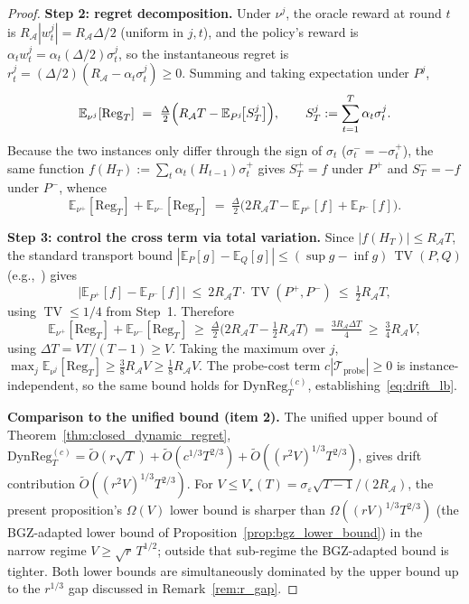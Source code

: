 \documentclass[11pt]{article}
\newcommand{\E}{\mathbb{E}}
\newcommand{\cA}{\mathcal{A}}
\newcommand{\cTprobe}{\mathcal{T}_{\mathrm{probe}}}
\newcommand{\DynReg}{\mathrm{DynReg}}
\DeclareMathOperator{\TV}{TV}
\begin{document}
\begin{proof}
\textbf{Step 2: regret decomposition.}
Under $\nu^{j}$, the oracle reward at round $t$ is $R_{\cA}|w_t^{j}|=R_{\cA}\Delta/2$
(uniform in $j,t$), and the policy's reward is
$\alpha_t w_t^{j}=\alpha_t(\Delta/2)\sigma_t^{j}$, so the instantaneous regret is
$r_t^{j}=(\Delta/2)(R_{\cA}-\alpha_t\sigma_t^{j})\ge 0$.  Summing and taking
expectation under $P^{j}$,
\[
  \E_{\nu^{j}}[\mathrm{Reg}_T]
  \ =\ \tfrac{\Delta}{2}\Bigl(R_{\cA}T-\E_{P^{j}}\!\bigl[S_T^{j}\bigr]\Bigr),
  \qquad
  S_T^{j}:=\sum_{t=1}^{T}\alpha_t\sigma_t^{j}.
\]
Because the two instances only differ through the sign of $\sigma_t$
($\sigma_t^{-}=-\sigma_t^{+}$), the same function $f(H_T):=\sum_{t}\alpha_t(H_{t-1})\sigma_t^{+}$
gives $S_T^{+}=f$ under $P^{+}$ and $S_T^{-}=-f$ under $P^{-}$, whence
\[
  \E_{\nu^{+}}[\mathrm{Reg}_T]+\E_{\nu^{-}}[\mathrm{Reg}_T]
  \ =\ \tfrac{\Delta}{2}\bigl(2R_{\cA}T-\E_{P^{+}}[f]+\E_{P^{-}}[f]\bigr).
\]

\textbf{Step 3: control the cross term via total variation.}
Since $|f(H_T)|\le R_{\cA}T$, the standard transport bound
$|\E_{P}[g]-\E_{Q}[g]|\le(\sup g-\inf g)\,\TV(P,Q)$ (e.g.,~\citet[Lemma~2.1]{tsybakov2009introduction})
gives
\[
  \bigl|\E_{P^{+}}[f]-\E_{P^{-}}[f]\bigr|
  \ \le\ 2R_{\cA}T\cdot\TV(P^{+},P^{-})
  \ \le\ \tfrac{1}{2}R_{\cA}T,
\]
using $\TV\le 1/4$ from Step~1.  Therefore
\[
  \E_{\nu^{+}}[\mathrm{Reg}_T]+\E_{\nu^{-}}[\mathrm{Reg}_T]
  \ \ge\ \tfrac{\Delta}{2}\bigl(2R_{\cA}T-\tfrac{1}{2}R_{\cA}T\bigr)
  \ =\ \tfrac{3R_{\cA}\Delta T}{4}
  \ \ge\ \tfrac{3}{4}R_{\cA}V,
\]
using $\Delta T=VT/(T-1)\ge V$.  Taking the maximum over $j$,
$\max_{j}\E_{\nu^{j}}[\mathrm{Reg}_T]\ge\tfrac{3}{8}R_{\cA}V\ge\tfrac{1}{8}R_{\cA}V$.
The probe-cost term $c|\cTprobe|\ge 0$ is instance-independent, so the same bound
holds for $\DynReg_T^{(c)}$, establishing~\eqref{eq:drift_lb}.

\textbf{Comparison to the unified bound (item 2).}
The unified upper bound of Theorem~\ref{thm:closed_dynamic_regret},
$\DynReg_T^{(c)}=\widetilde O(r\sqrt T)+\widetilde O(c^{1/3}T^{2/3})+\widetilde O((r^2V)^{1/3}T^{2/3})$,
gives drift contribution $\widetilde O((r^2V)^{1/3}T^{2/3})$.  For $V\le V_\star(T)=\sigma_\varepsilon\sqrt{T-1}/(2R_\cA)$,
the present proposition's $\Omega(V)$ lower bound is sharper than
$\Omega((rV)^{1/3}T^{2/3})$ (the BGZ-adapted lower bound of
Proposition~\ref{prop:bgz_lower_bound}) in the narrow regime
$V\ge\sqrt r\,T^{1/2}$; outside that sub-regime the BGZ-adapted bound is
tighter.  Both lower bounds are simultaneously dominated by the upper bound
up to the $r^{1/3}$ gap discussed in Remark~\ref{rem:r_gap}.


\end{proof}
\end{document}
